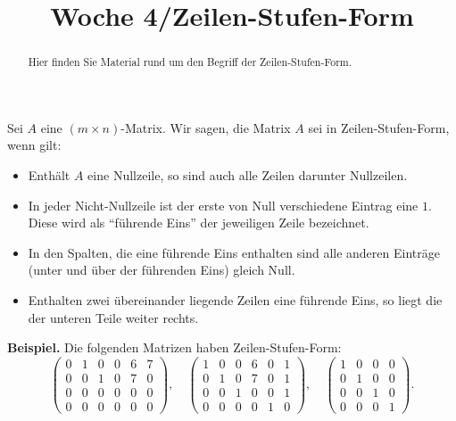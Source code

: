 \documentclass{ximera}
\title{Woche 4/Zeilen-Stufen-Form}
\begin{document}
\begin{abstract}
Hier finden Sie Material rund um den Begriff der Zeilen-Stufen-Form.
\end{abstract}
\maketitle

Sei $A$ eine $(m\times n)$-Matrix. Wir sagen, die Matrix $A$ sei in Zeilen-Stufen-Form, wenn gilt:
\begin{itemize}
\item
Enthält $A$ eine Nullzeile, so sind auch alle Zeilen darunter Nullzeilen.
\item
In jeder Nicht-Nullzeile ist der erste von Null verschiedene Eintrag eine $1$. Diese wird als ``führende Eins'' der jeweiligen Zeile bezeichnet.
\item
In den Spalten, die eine führende Eins enthalten sind alle anderen Einträge (unter und über der führenden Eins) gleich Null.
\item
Enthalten zwei übereinander liegende Zeilen eine führende Eins, so liegt die der unteren Teile weiter rechts.
\end{itemize}

\textbf{Beispiel.}
Die folgenden Matrizen haben Zeilen-Stufen-Form:
\[
\left(
\begin{array}{cccccc}
0 & 1 & 0 & 0 & 6 & 7 \\
0 & 0 & 1 & 0 & 7 & 0 \\
0 & 0 & 0 & 0 & 0 & 0 \\
0 & 0 & 0 & 0 & 0 & 0 
\end{array}
\right), \quad
%
\left(
\begin{array}{ccccccc}
1 & 0 & 0 & 6 & 0 & 1 \\
0 & 1 & 0 & 7 & 0 & 1 \\
0 & 0 & 1 & 0 & 0 & 1 \\
0 & 0 & 0 & 0 & 1 & 0
\end{array}
\right), \quad
%
\left(
\begin{array}{ccccc}
1 & 0 & 0 & 0 \\
0 & 1 & 0 & 0 \\
0 & 0 & 1 & 0 \\
0 & 0 & 0 & 1 
\end{array}
\right).
\]
\end{document}
